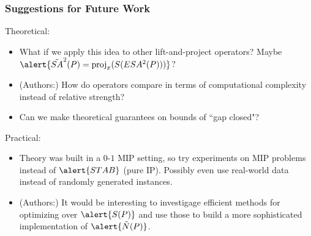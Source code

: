 \documentclass{beamer}
\DeclareMathOperator{\proj}{proj}
\begin{document}
\begin{frame}
\frametitle{Suggestions for Future Work}
Theoretical:
\begin{itemize}
\item What if we apply this idea to other lift-and-project operators? Maybe $\alert{\tilde{SA}^2(P) = \proj_x (S(ESA^2(P)))}$?
\item (Authors:) How do operators compare in terms of computational complexity instead of relative strength?
\item Can we make theoretical guarantees on bounds of ``gap closed"?
\end{itemize}
Practical:
\begin{itemize}
\item Theory was built in a $0$-$1$ MIP setting, so try experiments on MIP problems instead of $\alert{STAB}$ (pure IP). Possibly even use real-world data instead of randomly generated instances.
\item (Authors:) It would be interesting to investigage efficient methods for optimizing over $\alert{S(P)}$ and use those to build a more sophisticated implementation of $\alert{\tilde{N}(P)}$.
\end{itemize}
\end{frame}
\end{document}
